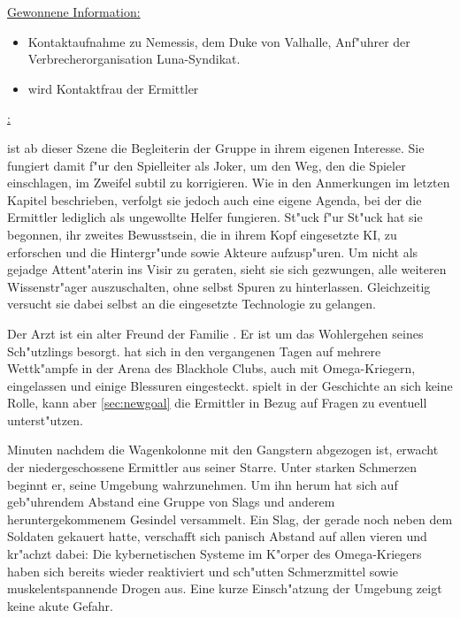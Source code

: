 \begin{remarks}
	\underline{Gewonnene Information:}
	
	\begin{itemize}
		\item Kontaktaufnahme zu Nemessis, dem Duke von Valhalle, Anf"uhrer der Verbrecherorganisation Luna-Syndikat.
		\item \xl{} wird Kontaktfrau der Ermittler
	\end{itemize}

	\underline{\xl{}:}

	\xl{} ist ab dieser Szene die Begleiterin der Gruppe in ihrem eigenen Interesse. Sie fungiert damit f"ur den Spielleiter als Joker, um den Weg, den die Spieler einschlagen, im Zweifel subtil zu korrigieren. Wie in den Anmerkungen im letzten Kapitel beschrieben, verfolgt sie jedoch auch eine eigene Agenda, bei der die Ermittler lediglich als ungewollte Helfer fungieren. St"uck f"ur St"uck hat sie begonnen, ihr zweites Bewusstsein, die in ihrem Kopf eingesetzte KI, zu erforschen und die Hintergr"unde sowie Akteure aufzusp"uren.  Um nicht als gejadge Attent"aterin ins Visir zu geraten, sieht sie sich gezwungen, alle weiteren Wissenstr"ager auszuschalten, ohne selbst Spuren zu hinterlassen. Gleichzeitig versucht sie dabei selbst an die eingesetzte Technologie zu gelangen.

	\underline{ }

	Der Arzt   ist ein alter Freund der Familie . Er ist um das Wohlergehen seines Sch"utzlings \xl{} besorgt. \xl{} hat sich in den vergangenen Tagen auf mehrere Wettk"ampfe in der Arena des Blackhole Clubs, auch mit Omega-Kriegern, eingelassen und einige Blessuren eingesteckt.   spielt in der Geschichte an sich keine Rolle, kann aber  \cref{sec:newgoal} die Ermittler in Bezug auf Fragen zu \xl{} eventuell unterst"utzen.
\end{remarks}



Minuten nachdem die Wagenkolonne mit den Gangstern abgezogen ist, erwacht der niedergeschossene Ermittler aus seiner Starre. Unter starken Schmerzen beginnt er, seine Umgebung wahrzunehmen. Um ihn herum hat sich auf geb"uhrendem Abstand eine Gruppe von Slags und anderem heruntergekommenem Gesindel versammelt. Ein Slag, der gerade noch neben dem Soldaten gekauert hatte, verschafft sich panisch Abstand auf allen vieren und kr"achzt dabei:  Die kybernetischen Systeme im K"orper des 
Omega-Kriegers haben sich bereits wieder reaktiviert und sch"utten Schmerzmittel sowie muskelentspannende Drogen aus. Eine kurze Einsch"atzung der Umgebung zeigt keine akute Gefahr.

